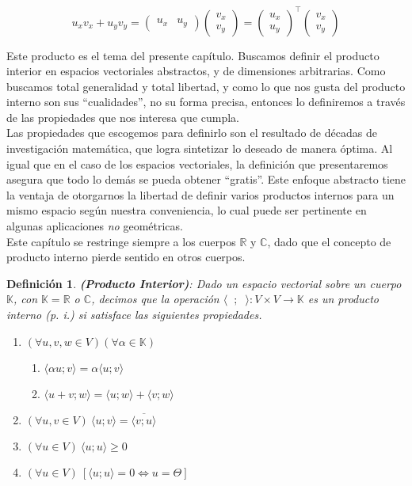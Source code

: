 \documentclass[12pt]{book}
\newtheorem{defi}{Definici\'on}
\def\R{\mathbb{R}}
\def\C{\mathbb{C}}
\def\K{\mathbb{K}}
\begin{document}
{  $$u_xv_x+u_yv_y=\left(\begin{array}{rr}u_x&u_y\end{array}\right)\left(\begin{array}{r}v_x\\ v_y\end{array}\right)=\left(\begin{array}{r}u_x\\u_y\end{array}\right)^\top\left(\begin{array}{r}v_x\\ v_y\end{array}\right)$$
  
  \vspace{0.2 cm}

Este producto es el tema del presente capítulo. Buscamos definir el producto interior en espacios vectoriales abstractos, y de dimensiones arbitrarias. Como buscamos total generalidad y total libertad, y como lo que nos gusta del producto interno son sus ``cualidades'', no su forma precisa, entonces lo definiremos a través de las propiedades que nos interesa que cumpla.\\

Las propiedades que escogemos para definirlo son el resultado de décadas de investigación matemática, que logra sintetizar lo deseado de manera óptima. Al igual que en el caso de los espacios vectoriales, la definición que presentaremos asegura que todo lo demás se pueda obtener ``gratis''. Este enfoque abstracto tiene la ventaja de otorgarnos la libertad de definir varios productos internos para un mismo espacio según nuestra conveniencia, lo cual puede ser pertinente en algunas aplicaciones \emph{no} geométricas.\\

Este capítulo se restringe siempre a los cuerpos $\R$ y $\C$, dado que el concepto de producto interno pierde sentido en otros cuerpos.


\begin{defi}\textbf{{\em (Producto Interior)}}:
Dado un espacio vectorial sobre un cuerpo $\K$, con $\K=\R$ o $\C$, decimos que la operación $\langle \phantom{x};\phantom{x} \rangle:V\times V\rightarrow \K$ es un \emph{producto interno (p. i.)} si satisface las siguientes propiedades.
\begin{enumerate}
\item $(\forall u,v,w\in V)(\forall \alpha\in \K)$
\begin{enumerate}
\item $\langle \alpha u ; v\rangle=\alpha \langle u; v\rangle$
\item $\langle u+v ; w\rangle= \langle u; w\rangle+\langle v; w\rangle$
\end{enumerate}
\item\label{sim} $(\forall u,v\in V)\ \langle u ;v \rangle=\overline{\langle v ;u \rangle}$
\item\label{ge} $(\forall u\in V)\ \langle u;u\rangle \ge 0$
\item $(\forall u\in V)\ [\langle u;u\rangle = 0 \Leftrightarrow u=\Theta]$
\end{enumerate}
\end{defi}

}
\end{document}
